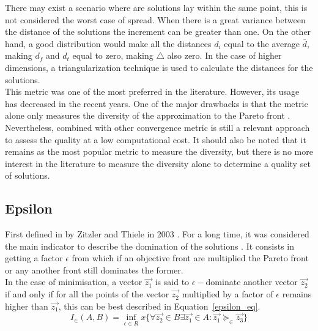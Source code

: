 There may exist a scenario where are solutions lay within the same point, this is not considered the worst case of spread. When there is a great variance between the distance of the solutions the increment can be greater than one. On the other hand, a good distribution would make all the distances $d_i$ equal to the average $\overline{d}$, making $d_f$ and $d_t$ equal to zero, making $\bigtriangleup$ also zero. In the case of higher dimensions, a triangularization technique is used to calculate the distances for the solutions. \\

This metric was one of the most preferred in the literature. However, its usage has decreased in the recent years. One of the major drawbacks is that the metric alone only measures the diversity of the approximation to the Pareto front \cite{riquelme2015performance}. Nevertheless, combined with other convergence metric is still a relevant approach to assess the quality at a low computational cost. It should also be noted that it remains as the most popular metric to measure the diversity, but there is no more interest in the literature to measure the diversity alone to determine a quality set of solutions.

\subsection{Epsilon}

First defined in by Zitzler and Thiele in 2003 \cite{zitzler2003performance}. For a long time, it was considered the main indicator to describe the domination of the solutions \cite{riquelme2015performance}. It consists in getting a factor $\epsilon$ from which if an objective front are multiplied the Pareto front or any another front still dominates the former.\\

In the case of minimisation, a vector $\vec{z_{1}}$ is said to $\epsilon-$dominate another vector $\vec{z_{2}}$ if and only if for all the points of the vector $\vec{z_{2}}$ multiplied by a factor of $\epsilon$ remains higher than $\vec{z_{1}}$, this can be best described in Equation~\ref{epsilon_eq}.\\

\begin{equation} 
    I_{\in}(A,B) = \inf_{ \epsilon \in R} x \{\forall \vec{z_{2}} \in B \exists  \vec{z_{1}}  \in A: \vec{z_{1}} \succeq_{ \in } \vec{z_{3}}\}
    \label{epsilon_eq}
\end{equation} \\

